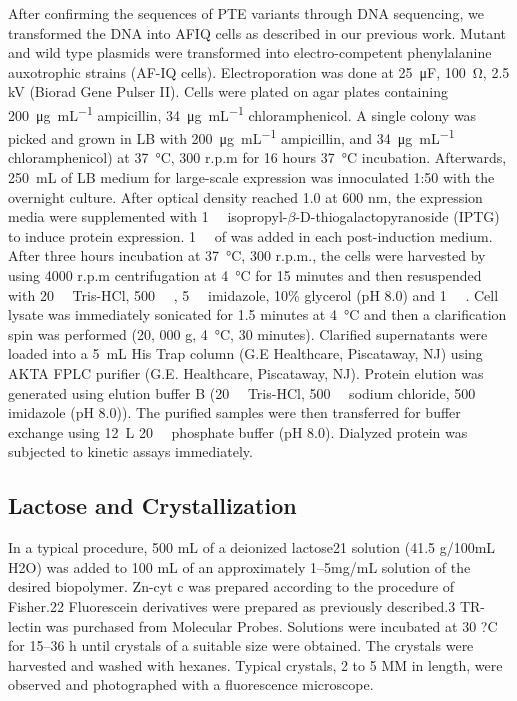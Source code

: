 \begin{refsection}
After confirming the sequences of PTE variants through DNA sequencing, we
transformed the DNA into AFIQ cells as described in our previous
work\cite{Yang2014a}. Mutant and wild type plasmids were transformed into
electro-competent  phenylalanine auxotrophic strains (AF-IQ
cells). Electroporation was done
at \SI{25}{\micro\farad}, \SI{100}{\ohm}, 2.5 kV (Biorad Gene Pulser II).
Cells were plated on agar plates containing \SI{200}{\ug\per\mL} ampicillin,
\SI{34}{\ug\per\mL} chloramphenicol. A single colony was picked and grown in LB
with \SI{200}{\ug\per\mL} ampicillin, and \SI{34}{\ug\per\mL} chloramphenicol)
at \SI{37}{\celsius}, 300 r.p.m for 16 hours \SI{37}{\celsius} incubation.
Afterwards, \SI{250}{\mL} of LB medium for large-scale expression was
innoculated 1:50 with the overnight culture.  After optical density reached 1.0
at 600 nm, the expression media were supplemented with \SI{1}{\milli\Molar}
isopropyl-$\beta$-D-thiogalactopyranoside (IPTG) to induce protein expression.
\SI{1}{\milli\Molar} of  was added in each post-induction medium.
After three hours incubation at \SI{37}{\celsius}, 300 r.p.m., the cells were
harvested by using 4000 r.p.m centrifugation at \SI{4}{\celsius} for 15 minutes
and then resuspended with \SI{20}{\milli\Molar} Tris-HCl,
\SI{500}{\milli\Molar} , \SI{5}{\milli\Molar} imidazole, 10\% glycerol
(pH 8.0) and \SI{1}{\micro\Molar} . Cell lysate was immediately
sonicated for 1.5 minutes at \SI{4}{\celsius} and then a clarification spin was
performed (20, 000 g, \SI{4}{\celsius}, 30 minutes).  Clarified supernatants
were loaded into a \SI{5}{\mL} His Trap column (G.E Healthcare, Piscataway, NJ)
using AKTA FPLC purifier (G.E.  Healthcare, Piscataway, NJ).  Protein elution
was generated using elution buffer B (\SI{20}{\milli\Molar} Tris-HCl,
\SI{500}{\milli\Molar} sodium chloride, \SI{500}{\milli\Molar} imidazole (pH
8.0)).  The purified samples were then transferred for buffer exchange using
\SI{12}{\L} \SI{20}{\milli\Molar} phosphate buffer (pH 8.0).  Dialyzed protein
was subjected to kinetic assays immediately.

\subsection{Lactose and Crystallization}

In a typical procedure, 500 mL of a deionized lactose21 solution (41.5 g/100mL
H2O) was added to 100 mL of an approximately 1–5mg/mL solution of the desired
biopolymer. Zn-cyt c was prepared according to the procedure of Fisher.22
Fluorescein derivatives were prepared as previously described.3 TR-lectin was
purchased from Molecular Probes. Solutions were incubated at 30 ?C for 15–36 h
until crystals of a suitable size were obtained. The crystals were harvested
and washed with hexanes. Typical crystals, 2 to 5 MM in length, were observed
and photographed with a fluorescence microscope.


\end{refsection}
